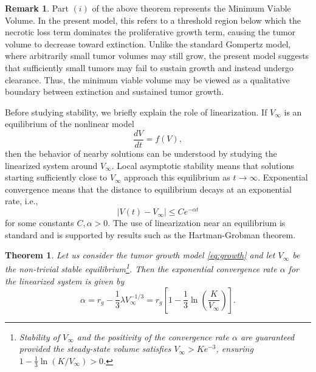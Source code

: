 \documentclass[11pt, reqno]{amsart}
\numberwithin{equation}{section}
\newtheorem{theorem}{Theorem}[section]
\theoremstyle{definition}
\newtheorem{remark}[definition]{Remark}
\begin{document}
\begin{remark}
Part $(i)$ of the above theorem represents the Minimum Viable Volume. In the present model, this refers to a threshold region below which the necrotic loss term dominates the proliferative growth term, causing the tumor volume to decrease toward extinction. Unlike the standard Gompertz model, where arbitrarily small tumor volumes may still grow, the present model suggests that sufficiently small tumors may fail to sustain growth and instead undergo clearance. Thus, the minimum viable volume may be viewed as a qualitative boundary between extinction and sustained tumor growth.
\end{remark}


Before studying stability, we briefly explain the role of linearization. If $V_\infty$ is an equilibrium of the nonlinear model
\[
\frac{dV}{dt}=f(V),
\]
then the behavior of nearby solutions can be understood by studying the linearized system around $V_\infty$. Local asymptotic stability means that solutions starting sufficiently close to $V_\infty$ approach this equilibrium as $t\to\infty$. Exponential convergence means that the distance to equilibrium decays at an exponential rate, i.e.,
\[
|V(t)-V_\infty|
\le
Ce^{-\alpha t}
\]
for some constants $C,\alpha>0$. The use of linearization near an equilibrium is standard and is supported by results such as the Hartman-Grobman theorem.

\begin{theorem}\label{thm_preop}
Let us consider the tumor growth model \eqref{eq:growth} and let $V_{\infty}$ be the non-trivial stable equilibrium\footnote{Stability of $V_{\infty}$ and the positivity of the convergence rate $\alpha$ are guaranteed provided the steady-state volume satisfies $V_{\infty} > Ke^{-3}$, ensuring $1 - \frac{1}{3}\ln(K/V_{\infty}) > 0$.}. Then the exponential convergence rate $\alpha$ for the linearized system is given by
\begin{equation}
\alpha = r_{g} - \frac{1}{3} \lambda V_{\infty}^{-1/3} = r_{g} \left[ 1 - \frac{1}{3} \ln \left( \frac{K}{V_{\infty}} \right) \right].
\end{equation}
\end{theorem}
\end{document}
